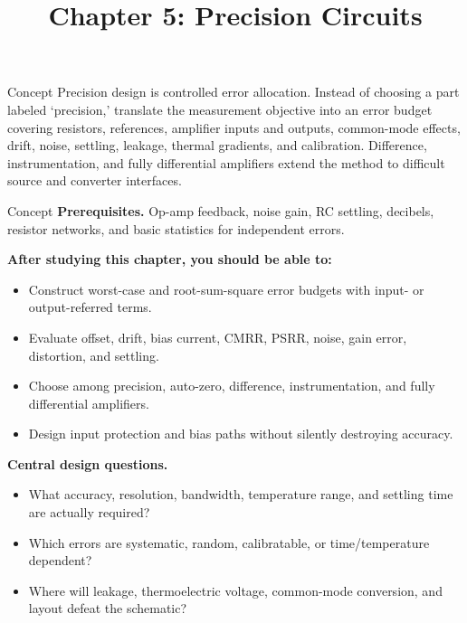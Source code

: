 \documentclass[10pt,letterpaper]{article}
\title{Chapter 5: Precision Circuits}
\author{}
\date{}
\begin{document}
\maketitle

\begin{CornellOverviewBox}{Concept}
Precision design is controlled error allocation. Instead of choosing a part labeled `precision,' translate the measurement objective into an error budget covering resistors, references, amplifier inputs and outputs, common-mode effects, drift, noise, settling, leakage, thermal gradients, and calibration. Difference, instrumentation, and fully differential amplifiers extend the method to difficult source and converter interfaces.
\end{CornellOverviewBox}
\begin{CornellOverviewBox}{Concept}
\textbf{Prerequisites.} Op-amp feedback, noise gain, RC settling, decibels, resistor networks, and basic statistics for independent errors.

\textbf{After studying this chapter, you should be able to:}
\begin{itemize}
  \item Construct worst-case and root-sum-square error budgets with input- or output-referred terms.
  \item Evaluate offset, drift, bias current, CMRR, PSRR, noise, gain error, distortion, and settling.
  \item Choose among precision, auto-zero, difference, instrumentation, and fully differential amplifiers.
  \item Design input protection and bias paths without silently destroying accuracy.
\end{itemize}\textbf{Central design questions.}
\begin{itemize}
  \item What accuracy, resolution, bandwidth, temperature range, and settling time are actually required?
  \item Which errors are systematic, random, calibratable, or time/temperature dependent?
  \item Where will leakage, thermoelectric voltage, common-mode conversion, and layout defeat the schematic?
\end{itemize}\end{CornellOverviewBox}
\end{document}
